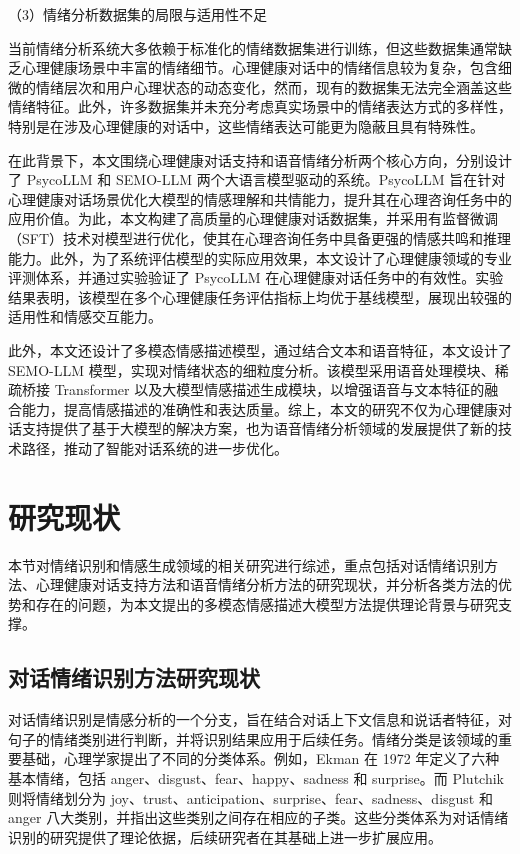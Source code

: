 （3）情绪分析数据集的局限与适用性不足

当前情绪分析系统大多依赖于标准化的情绪数据集进行训练，但这些数据集通常缺乏心理健康场景中丰富的情绪细节。心理健康对话中的情绪信息较为复杂，包含细微的情绪层次和用户心理状态的动态变化，然而，现有的数据集无法完全涵盖这些情绪特征。此外，许多数据集并未充分考虑真实场景中的情绪表达方式的多样性，特别是在涉及心理健康的对话中，这些情绪表达可能更为隐蔽且具有特殊性。

\vspace{1em}

在此背景下，本文围绕心理健康对话支持和语音情绪分析两个核心方向，分别设计了 PsycoLLM 和 SEMO-LLM 两个大语言模型驱动的系统。PsycoLLM 旨在针对心理健康对话场景优化大模型的情感理解和共情能力，提升其在心理咨询任务中的应用价值。为此，本文构建了高质量的心理健康对话数据集，并采用有监督微调（SFT）技术对模型进行优化，使其在心理咨询任务中具备更强的情感共鸣和推理能力。此外，为了系统评估模型的实际应用效果，本文设计了心理健康领域的专业评测体系，并通过实验验证了 PsycoLLM 在心理健康对话任务中的有效性。实验结果表明，该模型在多个心理健康任务评估指标上均优于基线模型，展现出较强的适用性和情感交互能力。

此外，本文还设计了多模态情感描述模型，通过结合文本和语音特征，本文设计了 SEMO-LLM 模型，实现对情绪状态的细粒度分析。该模型采用语音处理模块、稀疏桥接 Transformer 以及大模型情感描述生成模块，以增强语音与文本特征的融合能力，提高情感描述的准确性和表达质量。综上，本文的研究不仅为心理健康对话支持提供了基于大模型的解决方案，也为语音情绪分析领域的发展提供了新的技术路径，推动了智能对话系统的进一步优化。

\section{研究现状}

本节对情绪识别和情感生成领域的相关研究进行综述，重点包括对话情绪识别方法、心理健康对话支持方法和语音情绪分析方法的研究现状，并分析各类方法的优势和存在的问题，为本文提出的多模态情感描述大模型方法提供理论背景与研究支撑。

\subsection{对话情绪识别方法研究现状}

对话情绪识别是情感分析的一个分支，旨在结合对话上下文信息和说话者特征，对句子的情绪类别进行判断，并将识别结果应用于后续任务。情绪分类是该领域的重要基础，心理学家提出了不同的分类体系。例如，Ekman\cite{Ekman_1993} 在 1972 年定义了六种基本情绪，包括 anger、disgust、fear、happy、sadness 和 surprise。而 Plutchik\cite{Plutchik_1982} 则将情绪划分为 joy、trust、anticipation、surprise、fear、sadness、disgust 和 anger 八大类别，并指出这些类别之间存在相应的子类。这些分类体系为对话情绪识别的研究提供了理论依据，后续研究者在其基础上进一步扩展应用。

